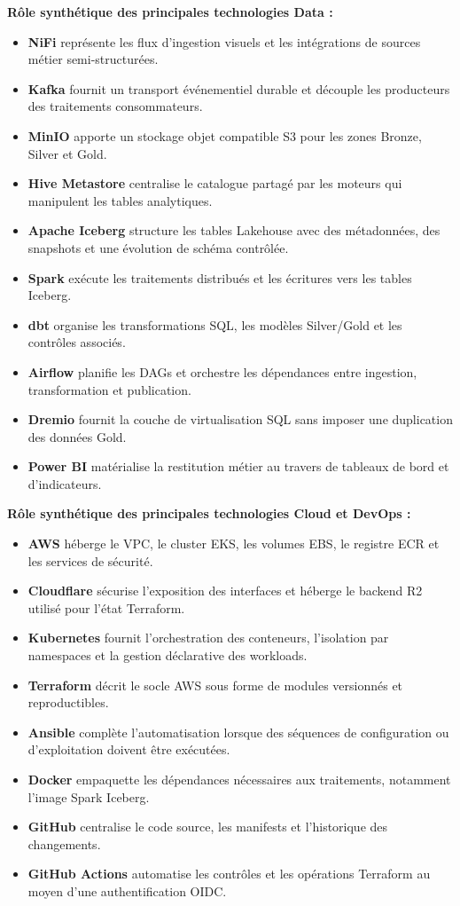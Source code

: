\textbf{Rôle synthétique des principales technologies Data :}
\begin{itemize}
    \item \textbf{NiFi} représente les flux d'ingestion visuels et les intégrations de sources métier semi-structurées.
    \item \textbf{Kafka} fournit un transport événementiel durable et découple les producteurs des traitements consommateurs.
    \item \textbf{MinIO} apporte un stockage objet compatible S3 pour les zones Bronze, Silver et Gold.
    \item \textbf{Hive Metastore} centralise le catalogue partagé par les moteurs qui manipulent les tables analytiques.
    \item \textbf{Apache Iceberg} structure les tables Lakehouse avec des métadonnées, des snapshots et une évolution de schéma contrôlée.
    \item \textbf{Spark} exécute les traitements distribués et les écritures vers les tables Iceberg.
    \item \textbf{dbt} organise les transformations SQL, les modèles Silver/Gold et les contrôles associés.
    \item \textbf{Airflow} planifie les DAGs et orchestre les dépendances entre ingestion, transformation et publication.
    \item \textbf{Dremio} fournit la couche de virtualisation SQL sans imposer une duplication des données Gold.
    \item \textbf{Power BI} matérialise la restitution métier au travers de tableaux de bord et d'indicateurs.
\end{itemize}

\textbf{Rôle synthétique des principales technologies Cloud et DevOps :}
\begin{itemize}
    \item \textbf{AWS} héberge le VPC, le cluster EKS, les volumes EBS, le registre ECR et les services de sécurité.
    \item \textbf{Cloudflare} sécurise l'exposition des interfaces et héberge le backend R2 utilisé pour l'état Terraform.
    \item \textbf{Kubernetes} fournit l'orchestration des conteneurs, l'isolation par namespaces et la gestion déclarative des workloads.
    \item \textbf{Terraform} décrit le socle AWS sous forme de modules versionnés et reproductibles.
    \item \textbf{Ansible} complète l'automatisation lorsque des séquences de configuration ou d'exploitation doivent être exécutées.
    \item \textbf{Docker} empaquette les dépendances nécessaires aux traitements, notamment l'image Spark Iceberg.
    \item \textbf{GitHub} centralise le code source, les manifests et l'historique des changements.
    \item \textbf{GitHub Actions} automatise les contrôles et les opérations Terraform au moyen d'une authentification OIDC.
\end{itemize}

